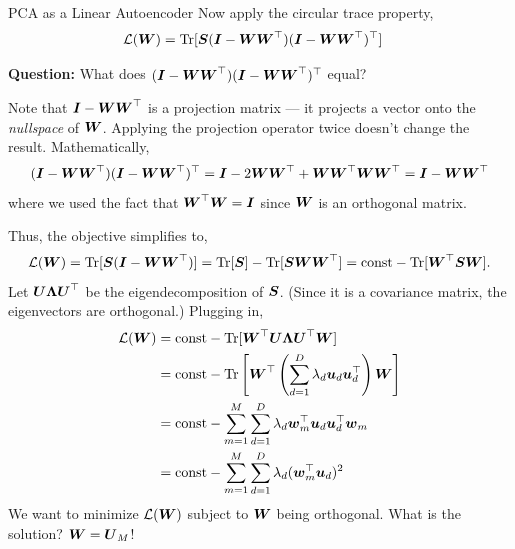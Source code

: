 \documentclass[aspectratio=169]{beamer}
\begin{document}
\begin{frame}[t,allowframebreaks]{PCA as a Linear
Autoencoder}
Now apply the circular trace property, 
\begin{align*}
    \mathcal{L}(\boldsymbol{W}) 
    &= \textrm{Tr}[\boldsymbol{S} (\boldsymbol{I} - \boldsymbol{W} \boldsymbol{W}^\top) (\boldsymbol{I} - \boldsymbol{W} \boldsymbol{W}^\top)^\top]
\end{align*}

\textbf{Question:} What does
\((\boldsymbol{I} - \boldsymbol{W} \boldsymbol{W}^\top) (\boldsymbol{I} - \boldsymbol{W} \boldsymbol{W}^\top)^\top\) equal? 

Note
that \(\boldsymbol{I} - \boldsymbol{W} \boldsymbol{W}^\top\) is a projection matrix --- it projects a
vector onto the \emph{nullspace} of \(\boldsymbol{W}\). Applying the projection
operator twice doesn't change the result. Mathematically, 
\begin{align*}
    (\boldsymbol{I} - \boldsymbol{W} \boldsymbol{W}^\top) (\boldsymbol{I} - \boldsymbol{W} \boldsymbol{W}^\top)^\top 
    = \boldsymbol{I} - 2 \boldsymbol{W} \boldsymbol{W}^\top + \boldsymbol{W} \boldsymbol{W}^\top \boldsymbol{W} \boldsymbol{W}^\top
    = \boldsymbol{I} - \boldsymbol{W} \boldsymbol{W}^\top
\end{align*} 
where we used the fact that \(\boldsymbol{W}^\top \boldsymbol{W} = \boldsymbol{I}\) since
\(\boldsymbol{W}\) is an orthogonal matrix. 

Thus, the objective simplifies to, \begin{align*}
    \mathcal{L}(\boldsymbol{W}) 
    = \textrm{Tr}[\boldsymbol{S}(\boldsymbol{I} - \boldsymbol{W} \boldsymbol{W}^\top)]
    = \textrm{Tr}[\boldsymbol{S}] - \textrm{Tr}[\boldsymbol{S} \boldsymbol{W} \boldsymbol{W}^\top]
    = \mathrm{const} - \textrm{Tr}[\boldsymbol{W}^\top \boldsymbol{S} \boldsymbol{W}].
\end{align*} Let \(\boldsymbol{U} \boldsymbol{\Lambda} \boldsymbol{U}^\top\) be the eigendecomposition
of \(\boldsymbol{S}\). (Since it is a covariance matrix, the eigenvectors are
orthogonal.) Plugging in, \begin{align*}
    \mathcal{L}(\boldsymbol{W}) 
    &= \mathrm{const} - \textrm{Tr}[\boldsymbol{W}^\top \boldsymbol{U} \boldsymbol{\Lambda} \boldsymbol{U}^\top \boldsymbol{W}] \\
    &= \mathrm{const} - \textrm{Tr}\left[\boldsymbol{W}^\top \left( \sum_{d=1}^D \lambda_d \boldsymbol{u}_d \boldsymbol{u}_d^\top \right) \boldsymbol{W}\right] \\
    &= \mathrm{const} - \sum_{m=1}^M \sum_{d=1}^D \lambda_d \boldsymbol{w}_m^\top \boldsymbol{u}_d \boldsymbol{u}_d^\top \boldsymbol{w}_m \\
    &= \mathrm{const} - \sum_{m=1}^M \sum_{d=1}^D \lambda_d (\boldsymbol{w}_m^\top \boldsymbol{u}_d)^2
\end{align*} We want to minimize \(\mathcal{L}(\boldsymbol{W})\) subject to \(\boldsymbol{W}\) being
orthogonal. What is the solution? \(\boldsymbol{W} = \boldsymbol{U}_M\)!
\end{frame}
\end{document}
